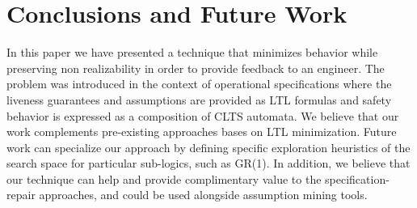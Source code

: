 \section{Conclusions and Future Work}\label{sec:conclusion}
In this paper we have presented a technique that minimizes behavior while
preserving non realizability in order to provide feedback to an engineer.
The problem was introduced in the context of operational specifications where
the liveness guarantees and assumptions are provided as LTL formulas and safety behavior
is expressed as a composition of CLTS automata.  %
We believe that our work complements pre-existing approaches bases on LTL minimization. 
Future work can specialize
our approach by defining specific exploration heuristics of the search space for particular sub-logics, such as GR(1).  
In addition, we believe that our technique can help and provide complimentary value to the
specification-repair approaches, and could be used alongside assumption mining
tools.

